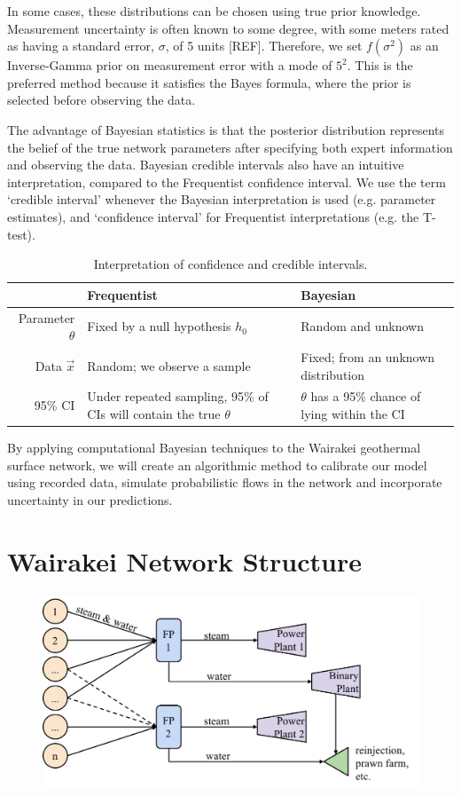 \documentclass[a4paper, 12pt]{article}
\begin{document}
In some cases, these distributions can be chosen using true prior knowledge. Measurement uncertainty is often known to some degree, with some meters rated as having a standard error, $\sigma$, of 5 units [REF]. Therefore, we set $f(\sigma^2)$ as an Inverse-Gamma prior on measurement error with a mode of $5^2$. This is the preferred method because it satisfies the Bayes formula, where the prior is selected before observing the data.

The advantage of Bayesian statistics is that the posterior distribution represents the belief of the true network parameters after specifying both expert information and observing the data. Bayesian credible intervals also have an intuitive interpretation, compared to the Frequentist confidence interval. We use the term `credible interval' whenever the Bayesian interpretation is used (e.g. parameter estimates), and `confidence interval' for Frequentist interpretations (e.g. the T-test).

\begin{table}[ht]
\centering
\begin{tabularx}{\linewidth}{rXX}
\hline
 & Frequentist & Bayesian \\ 
  \hline
Parameter $\theta$ & Fixed by a null hypothesis $h_0$ & Random and unknown \\\hline
Data $\vec{x}$ & Random; we observe a sample & Fixed; from an unknown distribution \\\hline
95\% CI & Under repeated sampling, 95\% of CIs will contain the true $\theta$ & $\theta$ has a 95\% chance of lying within the CI  \\
   \hline
\end{tabularx}
\caption{Interpretation of confidence and credible intervals.} 
\label{tab:ci}
\end{table}

By applying computational Bayesian techniques to the Wairakei geothermal surface network, we will create an algorithmic method to calibrate our model using recorded data, simulate probabilistic flows in the network and incorporate uncertainty in our predictions.

\section{Wairakei Network Structure}

\begin{figure}
  \centering
  \includegraphics[width=0.5\linewidth]{media/network_diagram}
  \label{fig:network_diagram}
\end{figure}
\end{document}
